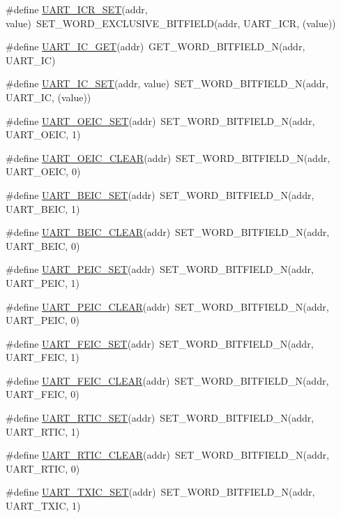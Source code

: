 \begin{DoxyCompactItemize}
\item 
\#define \hyperlink{a00574_a8cbc5c63fc5f959d586ae627a7744f70}{UART\_\-ICR\_\-SET}(addr, value)~SET\_\-WORD\_\-EXCLUSIVE\_\-BITFIELD(addr, UART\_\-ICR, (value))
\item 
\#define \hyperlink{a00574_a8db54d92cfb1297ccd3e3fae4f483ede}{UART\_\-IC\_\-GET}(addr)~GET\_\-WORD\_\-BITFIELD\_\-N(addr, UART\_\-IC)
\item 
\#define \hyperlink{a00574_ad8d2b33dacf491f941c7004f930f1f2d}{UART\_\-IC\_\-SET}(addr, value)~SET\_\-WORD\_\-BITFIELD\_\-N(addr, UART\_\-IC, (value))
\item 
\#define \hyperlink{a00574_ac27b58af5f16c6f2f0f3a277fbf491b4}{UART\_\-OEIC\_\-SET}(addr)~SET\_\-WORD\_\-BITFIELD\_\-N(addr, UART\_\-OEIC, 1)
\item 
\#define \hyperlink{a00574_ac79f5de0852ba43fbbcba5fcc25ef3dd}{UART\_\-OEIC\_\-CLEAR}(addr)~SET\_\-WORD\_\-BITFIELD\_\-N(addr, UART\_\-OEIC, 0)
\item 
\#define \hyperlink{a00574_a6f89511650131e55525f4b3ce44aaeac}{UART\_\-BEIC\_\-SET}(addr)~SET\_\-WORD\_\-BITFIELD\_\-N(addr, UART\_\-BEIC, 1)
\item 
\#define \hyperlink{a00574_a2fe6a5b9b8d622862710f18395e2a68b}{UART\_\-BEIC\_\-CLEAR}(addr)~SET\_\-WORD\_\-BITFIELD\_\-N(addr, UART\_\-BEIC, 0)
\item 
\#define \hyperlink{a00574_a31221af0455f1b0b09c782522b0d1421}{UART\_\-PEIC\_\-SET}(addr)~SET\_\-WORD\_\-BITFIELD\_\-N(addr, UART\_\-PEIC, 1)
\item 
\#define \hyperlink{a00574_a10803e8fb8e63903989bcc54b87ca660}{UART\_\-PEIC\_\-CLEAR}(addr)~SET\_\-WORD\_\-BITFIELD\_\-N(addr, UART\_\-PEIC, 0)
\item 
\#define \hyperlink{a00574_a50da925bada325a53ec755bfad576875}{UART\_\-FEIC\_\-SET}(addr)~SET\_\-WORD\_\-BITFIELD\_\-N(addr, UART\_\-FEIC, 1)
\item 
\#define \hyperlink{a00574_ace5782d6a44a46860fe6216de19f0fb2}{UART\_\-FEIC\_\-CLEAR}(addr)~SET\_\-WORD\_\-BITFIELD\_\-N(addr, UART\_\-FEIC, 0)
\item 
\#define \hyperlink{a00574_a369013adf0059b6d0858209c03b769de}{UART\_\-RTIC\_\-SET}(addr)~SET\_\-WORD\_\-BITFIELD\_\-N(addr, UART\_\-RTIC, 1)
\item 
\#define \hyperlink{a00574_abfadd16075328fc3bfad7a0a3e127e21}{UART\_\-RTIC\_\-CLEAR}(addr)~SET\_\-WORD\_\-BITFIELD\_\-N(addr, UART\_\-RTIC, 0)
\item 
\#define \hyperlink{a00574_ae05b8b2631240bff089e9cf8b270a8a4}{UART\_\-TXIC\_\-SET}(addr)~SET\_\-WORD\_\-BITFIELD\_\-N(addr, UART\_\-TXIC, 1)

\end{DoxyCompactItemize}
